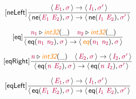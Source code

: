 \documentclass[10pt,leqno,fleqn]{article}
\newcommand{\artVariable}[1]{\mbox{\color{purple}\em #1\/}}
\newcommand{\artConstructor}[1]{\mbox{\sf #1}}
\newcommand{\artSpecial}[1]{\mbox{\color{orange}\sf\em #1}}
\begin{document}
\begin{equation}
\tag*{[\artConstructor{\sf neLeft}]}
\begin{split}\frac{\langle\, \artVariable{E$_{1}$}, \artVariable{$\sigma$}\,\rangle \rightarrow \langle\, \artVariable{I$_{1}$}, \artVariable{$\sigma$\/$^\prime$}\,\rangle }{\langle\, \artConstructor{\sf ne}(\artVariable{E$_{1}$}\ \artVariable{E$_{2}$}), \artVariable{$\sigma$}\,\rangle \rightarrow \langle\, \artConstructor{\sf ne}(\artVariable{I$_{1}$}\ \artVariable{E$_{2}$}), \artVariable{$\sigma$\/$^\prime$}\,\rangle }
\end{split}
\end{equation}

\begin{equation}
\tag*{[\artConstructor{\sf eq}]}
\begin{split}\frac{ \artVariable{n$_{1}$}\triangleright \artSpecial{int32}(\_) \quad  \artVariable{n$_{2}$}\triangleright \artSpecial{int32}(\_) }{\langle\, \artConstructor{\sf eq}(\artVariable{n$_{1}$}\ \artVariable{n$_{2}$}), \artVariable{$\sigma$}\,\rangle \rightarrow \langle\, \artSpecial{eq}(\artVariable{n$_{1}$}\ \artVariable{n$_{2}$}), \artVariable{$\sigma$}\,\rangle }
\end{split}
\end{equation}

\begin{equation}
\tag*{[\artConstructor{\sf eqRight}]}
\begin{split}\frac{ \artVariable{n}\triangleright \artSpecial{int32}(\_) \quad \langle\, \artVariable{E$_{2}$}, \artVariable{$\sigma$}\,\rangle \rightarrow \langle\, \artVariable{I$_{2}$}, \artVariable{$\sigma$\/$^\prime$}\,\rangle }{\langle\, \artConstructor{\sf eq}(\artVariable{n}\ \artVariable{E$_{2}$}), \artVariable{$\sigma$}\,\rangle \rightarrow \langle\, \artConstructor{\sf eq}(\artVariable{n}\ \artVariable{I$_{2}$}), \artVariable{$\sigma$\/$^\prime$}\,\rangle }
\end{split}
\end{equation}

\begin{equation}
\tag*{[\artConstructor{\sf eqLeft}]}
\begin{split}\frac{\langle\, \artVariable{E$_{1}$}, \artVariable{$\sigma$}\,\rangle \rightarrow \langle\, \artVariable{I$_{1}$}, \artVariable{$\sigma$\/$^\prime$}\,\rangle }{\langle\, \artConstructor{\sf eq}(\artVariable{E$_{1}$}\ \artVariable{E$_{2}$}), \artVariable{$\sigma$}\,\rangle \rightarrow \langle\, \artConstructor{\sf eq}(\artVariable{I$_{1}$}\ \artVariable{E$_{2}$}), \artVariable{$\sigma$\/$^\prime$}\,\rangle }
\end{split}
\end{equation}
\end{document}
